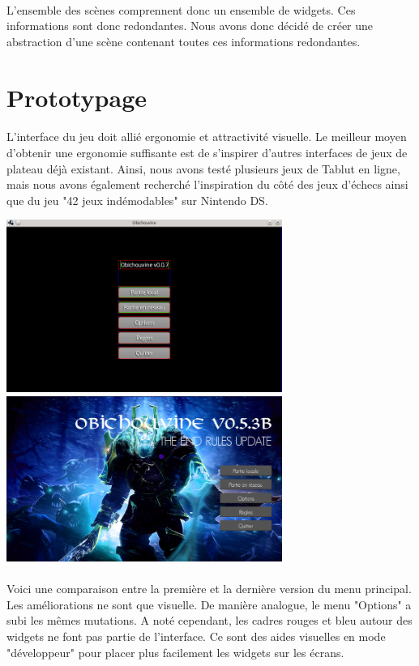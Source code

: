 \documentclass[11pt]{article} %
\begin{document}
\begin{sffamily}
\paragraph{}
L'ensemble des scènes comprennent donc un ensemble de widgets. Ces informations sont donc redondantes. Nous avons donc décidé de créer une abstraction d'une scène contenant toutes ces informations redondantes.

\section{Prototypage}
\paragraph{}
L'interface du jeu doit allié ergonomie et attractivité visuelle. Le meilleur moyen d'obtenir une ergonomie suffisante est de s'inspirer d'autres interfaces de jeux de plateau déjà existant. Ainsi, nous avons testé plusieurs jeux de Tablut en ligne, mais nous avons également recherché l'inspiration du côté des jeux d’échecs ainsi que du jeu "42 jeux indémodables" sur Nintendo DS.

\begin{center}
\includegraphics[width=9cm]{snapshot1.png}
\includegraphics[width=9cm]{validDoc1.jpg}
\end{center}

\paragraph{}
Voici une comparaison entre la première et la dernière version du menu principal. Les améliorations ne sont que visuelle. De manière analogue, le menu "Options" a subi les mêmes mutations. A noté cependant, les cadres rouges et bleu autour des widgets ne font pas partie de l'interface. Ce sont des aides visuelles en mode "développeur" pour placer plus facilement les widgets sur les écrans. 


\end{sffamily}
\end{document}
